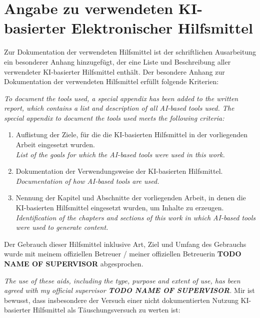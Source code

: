 \chapter*{Angabe zu verwendeten KI-basierter Elektronischer Hilfsmittel}

Zur Dokumentation der verwendeten Hilfsmittel ist der schriftlichen Ausarbeitung ein besonderer Anhang hinzugefügt, der eine Liste und Beschreibung aller verwendeter KI-basierter Hilfsmittel enthält. Der besondere Anhang zur Dokumentation der verwendeten Hilfsmittel erfüllt folgende Kriterien:

\emph{\small\color{dkfzgray2} To document the tools used, a special appendix has been added to the written report, which contains a list and description of all AI-based tools used. The special appendix to document the tools used meets the following criteria:}

\begin{enumerate}
    \item Auflistung der Ziele, für die die KI-basierten Hilfsmittel in der vorliegenden Arbeit eingesetzt wurden.\\
    \emph{\small\color{dkfzgray2} List of the goals for which the AI-based tools were used in this work.}
    \item Dokumentation der Verwendungsweise der KI-basierten Hilfsmittel.\\
    \emph{\small\color{dkfzgray2} Documentation of how AI-based tools are used.}
    \item Nennung der Kapitel und Abschnitte der vorliegenden Arbeit, in denen die KI-basierten Hilfsmittel eingesetzt wurden, um Inhalte zu erzeugen.\\
    \emph{\small\color{dkfzgray2} Identification of the chapters and sections of this work in which AI-based tools were used to generate content.}
\end{enumerate}

Der Gebrauch dieser Hilfsmittel inklusive Art, Ziel und Umfang des Gebrauchs wurde mit meinem offiziellen Betreuer / meiner offiziellen Betreuerin \textbf{TODO NAME OF SUPERVISOR} abgesprochen.

\emph{\small\color{dkfzgray2} The use of these aids, including the type, purpose and extent of use, has been agreed with my official supervisor \textbf{TODO NAME OF SUPERVISOR}.}
\newpage
Mir ist bewusst, dass insbesondere der Versuch einer nicht dokumentierten Nutzung KI- basierter Hilfsmittel als Täuschungsversuch zu werten ist:

